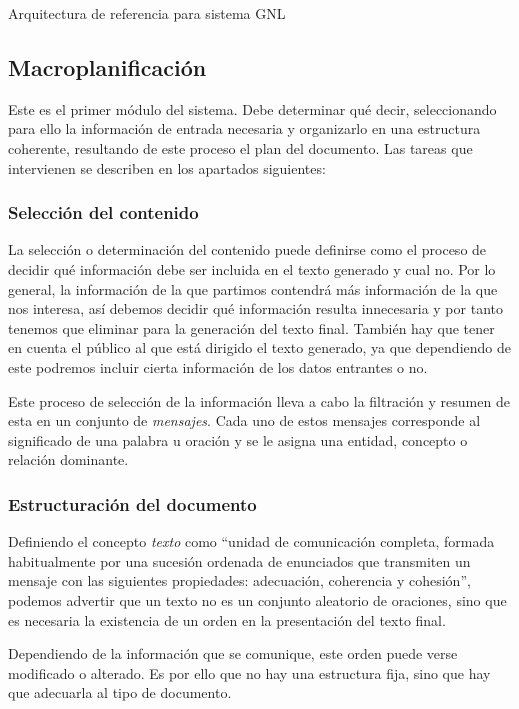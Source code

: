 %
{Arquitectura de referencia para sistema GNL \citep{vicente2015generacion}}

\subsection{Macroplanificación}
Este es el primer módulo del sistema. Debe determinar qué decir, seleccionando para ello la información de entrada necesaria y organizarlo en una estructura coherente, resultando de este proceso el plan del documento. Las tareas que intervienen se describen en los apartados siguientes: 

\subsubsection{Selección del contenido}
La selección o determinación del contenido puede definirse como el proceso de decidir qué información debe ser incluida en el texto generado y cual no. Por lo general, la información de la que partimos contendrá más información de la que nos interesa, así debemos decidir qué información resulta innecesaria y por tanto tenemos que eliminar para la generación del texto final. También hay que tener en cuenta el público al que está dirigido el texto generado, ya que dependiendo de este podremos incluir cierta información de los datos entrantes o no.

Este proceso de selección de la información lleva a cabo la filtración y resumen de esta en un conjunto de \textit{mensajes}. Cada uno de estos mensajes corresponde al significado de una palabra u oración y se le asigna una entidad, concepto o relación dominante.

\subsubsection{Estructuración del documento}
Definiendo el concepto \textit{texto} como ``unidad de comunicación completa, formada habitualmente por una sucesión ordenada de enunciados que transmiten un mensaje con las siguientes propiedades: adecuación, coherencia y cohesión'', podemos advertir que un texto no es un conjunto aleatorio de oraciones, sino que es necesaria la existencia de un orden en la presentación del texto final.

Dependiendo de la información que se comunique, este orden puede verse modificado o alterado. Es por ello que no hay una estructura fija, sino que hay que adecuarla al tipo de documento.

